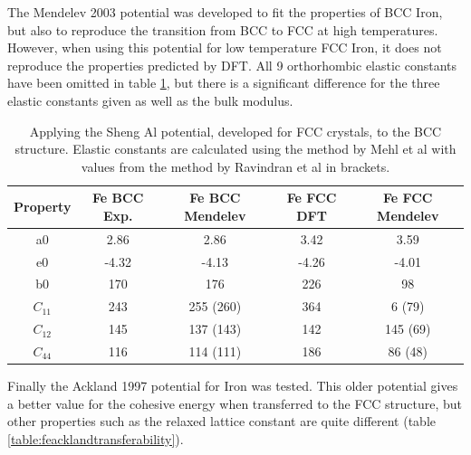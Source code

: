 The Mendelev 2003 potential was developed to fit the properties of BCC Iron, but also to reproduce the transition from BCC to FCC at high temperatures.  However, when using this potential for low  temperature FCC Iron, it does not reproduce the properties predicted by DFT.  All 9 orthorhombic elastic constants have been omitted in table \ref{table:femendelevtransferability}, but there is a significant difference for the three elastic constants given as well as the bulk modulus.

\begin{table}[h]
\begin{center}
\begin{tabular}{c c c c c}
\hline\hline
Property   & Fe BCC Exp. & Fe BCC Mendelev &  Fe FCC DFT & Fe FCC Mendelev \\
\hline\hline
a0             &   2.86  &   2.86      &   3.42   &   3.59          \\
e0             &  -4.32  &  -4.13      &  -4.26   &  -4.01          \\
b0             &   170  &    176       &  226     &   98            \\
$C_{11}$       &   243  &   255 (260)  &  364     &   6 (79)        \\
$C_{12}$       &   145  &   137 (143)  &  142     &   145 (69)      \\
$C_{44}$       &   116  &   114 (111)  &  186     &   86 (48)       \\
\hline\hline
\end{tabular}
\end{center}
\caption{Applying the Sheng Al potential, developed for FCC crystals, to the BCC structure.  Elastic constants are calculated using the method by Mehl et al with values from the method by Ravindran et al in brackets.}
\label{table:femendelevtransferability}
\end{table}

Finally the Ackland 1997 potential for Iron was tested.  This older potential gives a better value for the cohesive energy when transferred to the FCC structure, but other properties such as the relaxed lattice constant are quite different (table \ref{table:feacklandtransferability}).

